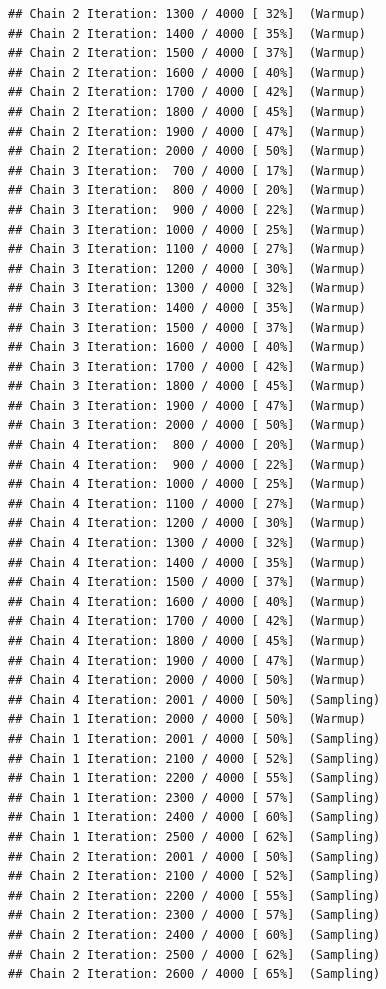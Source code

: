 \documentclass[
]{article}
\begin{document}
\begin{verbatim}
## Chain 2 Iteration: 1300 / 4000 [ 32%]  (Warmup) 
## Chain 2 Iteration: 1400 / 4000 [ 35%]  (Warmup) 
## Chain 2 Iteration: 1500 / 4000 [ 37%]  (Warmup) 
## Chain 2 Iteration: 1600 / 4000 [ 40%]  (Warmup) 
## Chain 2 Iteration: 1700 / 4000 [ 42%]  (Warmup) 
## Chain 2 Iteration: 1800 / 4000 [ 45%]  (Warmup) 
## Chain 2 Iteration: 1900 / 4000 [ 47%]  (Warmup) 
## Chain 2 Iteration: 2000 / 4000 [ 50%]  (Warmup) 
## Chain 3 Iteration:  700 / 4000 [ 17%]  (Warmup) 
## Chain 3 Iteration:  800 / 4000 [ 20%]  (Warmup) 
## Chain 3 Iteration:  900 / 4000 [ 22%]  (Warmup) 
## Chain 3 Iteration: 1000 / 4000 [ 25%]  (Warmup) 
## Chain 3 Iteration: 1100 / 4000 [ 27%]  (Warmup) 
## Chain 3 Iteration: 1200 / 4000 [ 30%]  (Warmup) 
## Chain 3 Iteration: 1300 / 4000 [ 32%]  (Warmup) 
## Chain 3 Iteration: 1400 / 4000 [ 35%]  (Warmup) 
## Chain 3 Iteration: 1500 / 4000 [ 37%]  (Warmup) 
## Chain 3 Iteration: 1600 / 4000 [ 40%]  (Warmup) 
## Chain 3 Iteration: 1700 / 4000 [ 42%]  (Warmup) 
## Chain 3 Iteration: 1800 / 4000 [ 45%]  (Warmup) 
## Chain 3 Iteration: 1900 / 4000 [ 47%]  (Warmup) 
## Chain 3 Iteration: 2000 / 4000 [ 50%]  (Warmup) 
## Chain 4 Iteration:  800 / 4000 [ 20%]  (Warmup) 
## Chain 4 Iteration:  900 / 4000 [ 22%]  (Warmup) 
## Chain 4 Iteration: 1000 / 4000 [ 25%]  (Warmup) 
## Chain 4 Iteration: 1100 / 4000 [ 27%]  (Warmup) 
## Chain 4 Iteration: 1200 / 4000 [ 30%]  (Warmup) 
## Chain 4 Iteration: 1300 / 4000 [ 32%]  (Warmup) 
## Chain 4 Iteration: 1400 / 4000 [ 35%]  (Warmup) 
## Chain 4 Iteration: 1500 / 4000 [ 37%]  (Warmup) 
## Chain 4 Iteration: 1600 / 4000 [ 40%]  (Warmup) 
## Chain 4 Iteration: 1700 / 4000 [ 42%]  (Warmup) 
## Chain 4 Iteration: 1800 / 4000 [ 45%]  (Warmup) 
## Chain 4 Iteration: 1900 / 4000 [ 47%]  (Warmup) 
## Chain 4 Iteration: 2000 / 4000 [ 50%]  (Warmup) 
## Chain 4 Iteration: 2001 / 4000 [ 50%]  (Sampling) 
## Chain 1 Iteration: 2000 / 4000 [ 50%]  (Warmup) 
## Chain 1 Iteration: 2001 / 4000 [ 50%]  (Sampling) 
## Chain 1 Iteration: 2100 / 4000 [ 52%]  (Sampling) 
## Chain 1 Iteration: 2200 / 4000 [ 55%]  (Sampling) 
## Chain 1 Iteration: 2300 / 4000 [ 57%]  (Sampling) 
## Chain 1 Iteration: 2400 / 4000 [ 60%]  (Sampling) 
## Chain 1 Iteration: 2500 / 4000 [ 62%]  (Sampling) 
## Chain 2 Iteration: 2001 / 4000 [ 50%]  (Sampling) 
## Chain 2 Iteration: 2100 / 4000 [ 52%]  (Sampling) 
## Chain 2 Iteration: 2200 / 4000 [ 55%]  (Sampling) 
## Chain 2 Iteration: 2300 / 4000 [ 57%]  (Sampling) 
## Chain 2 Iteration: 2400 / 4000 [ 60%]  (Sampling) 
## Chain 2 Iteration: 2500 / 4000 [ 62%]  (Sampling) 
## Chain 2 Iteration: 2600 / 4000 [ 65%]  (Sampling) 

\end{verbatim}
\end{document}
